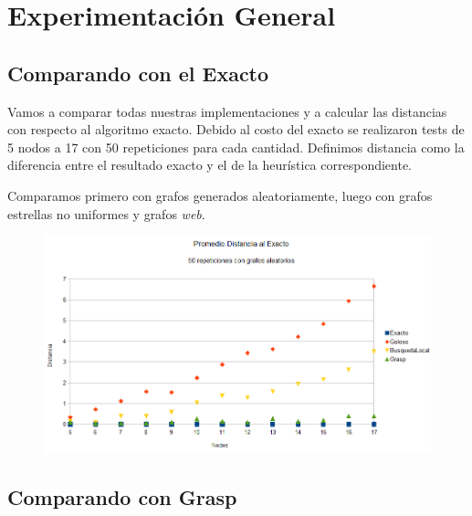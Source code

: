 \section{Experimentación General}


\subsection{Comparando con el Exacto}

\quad Vamos a comparar todas nuestras implementaciones y a calcular las distancias con respecto al algoritmo exacto. Debido al costo del exacto se realizaron tests de 5 nodos a 17 con 50 repeticiones para cada cantidad. Definimos distancia como la diferencia entre el resultado exacto y el de la heurística correspondiente. 


\quad Comparamos primero con grafos generados aleatoriamente, luego con grafos estrellas no uniformes y grafos \textit{web}.


\begin{figure}[H]
	\centering
	\includegraphics[scale=0.6]{distancia-Azar.png}
\end{figure}


%

\quad



\subsection{Comparando con Grasp}

